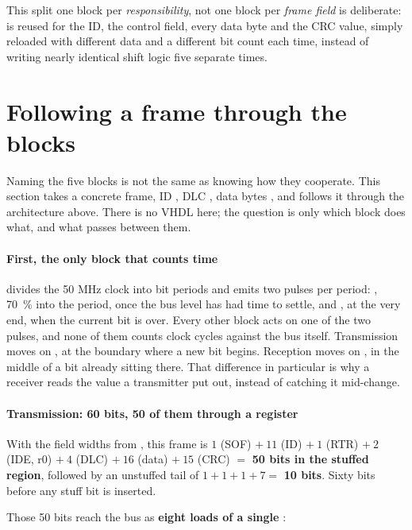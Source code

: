 This split \textemdash{} one block per \emph{responsibility}, not one block per \emph{frame field}
\textemdash{} is deliberate:  is reused for the ID, the control field, every data
byte and the CRC value, simply reloaded with different data and a different bit count each time,
instead of writing nearly identical shift logic five separate times.

\section{Following a frame through the blocks}
\label{c11:sec:trace}

Naming the five blocks is not the same as knowing how they cooperate. This section takes a concrete
frame, ID , DLC , data bytes , and follows it through the
architecture above. There is no VHDL here; the question is only which block does what, and what
passes between them.

\paragraph{First, the only block that counts time}
 divides the 50 MHz clock into bit periods and emits two pulses per period:
, 70~\% into the period, once the bus level has had time to settle, and
, at the very end, when the current bit is over. Every other block acts on one of the
two pulses, and none of them counts clock cycles against the bus itself. Transmission moves on
, at the boundary where a new bit begins. Reception moves on , in the
middle of a bit already sitting there. That difference in particular is why a receiver reads the
value a transmitter put out, instead of catching it mid-change.

\paragraph{Transmission: 60 bits, 50 of them through a register}
With the field widths from , this frame is $1$ (SOF) $+\ 11$ (ID) $+\ 1$ (RTR)
$+\ 2$ (IDE, r0) $+\ 4$ (DLC) $+\ 16$ (data) $+\ 15$ (CRC) $=$ \textbf{50 bits in the stuffed
region}, followed by an unstuffed tail of $1 + 1 + 1 + 7 =$ \textbf{10 bits}. Sixty bits before any
stuff bit is inserted.

Those 50 bits reach the bus as \textbf{eight loads of a single }:

